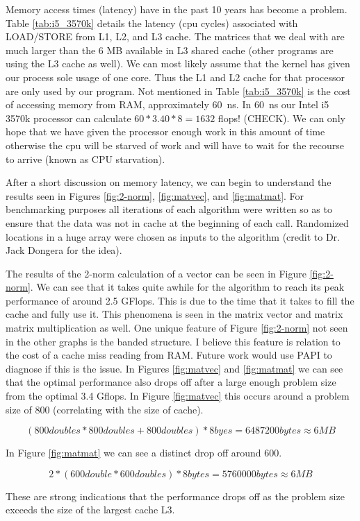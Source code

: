 \documentclass[a4paper,12pt]{article}
\begin{document}
Memory access times (latency) have in the past 10 years has become a problem. Table \ref{tab:i5_3570k} details the latency (cpu cycles) associated with LOAD/STORE from L1, L2, and L3 cache. The matrices that we deal with are much larger than the 6 MB available in L3 shared cache (other programs are using the L3 cache as well). We can most likely assume that the kernel has given our process sole usage of one core. Thus the L1 and L2 cache for that processor are only used by our program. Not mentioned in Table \ref{tab:i5_3570k} is the cost of accessing memory from RAM, approximately \SI{60}{\nano\second}. In \SI{60}{\nano\second} our Intel i5 3570k processor can calculate $60 * 3.40 * 8 = 1632$ flops! (CHECK). We can only hope that we have given the processor enough work in this amount of time otherwise the cpu will be starved of work and will have to wait for the recourse to arrive (known as CPU starvation).

After a short discussion on memory latency, we can begin to understand the results seen in Figures \ref{fig:2-norm}, \ref{fig:matvec}, and \ref{fig:matmat}. For benchmarking purposes all iterations of each algorithm were written so as to ensure that the data was not in cache at the beginning of each call. Randomized locations in a huge array were chosen as inputs to the algorithm (credit to Dr. Jack Dongera for the idea). 

The results of the 2-norm calculation of a vector can be seen in Figure \ref{fig:2-norm}. We can see that it takes quite awhile for the algorithm to reach its peak performance of around 2.5 GFlops. This is due to the time that it takes to fill the cache and fully use it. This phenomena is seen in the matrix vector and matrix matrix multiplication as well. One unique feature of Figure \ref{fig:2-norm} not seen in the other graphs is the banded structure. I believe this feature is relation to the cost of a cache miss reading from RAM. Future work would use PAPI to diagnose if this is the issue. In Figures \ref{fig:matvec} and \ref{fig:matmat} we can see that the optimal performance also drops off after a large enough problem size from the optimal 3.4 Gflops. In Figure \ref{fig:matvec} this occurs around a problem size of 800 (correlating with the size of cache).   

\[ (800 doubles * 800 doubles + 800 doubles ) * 8 byes = 6487200 bytes \approx 6 MB \]

In Figure \ref{fig:matmat} we can see a distinct drop off around 600.

\[ 2 * (600 double * 600 doubles) * 8 bytes = 5760000 bytes \approx 6 MB \]

These are strong indications that the performance drops off as the problem size exceeds the size of the largest cache L3. 
\end{document}
